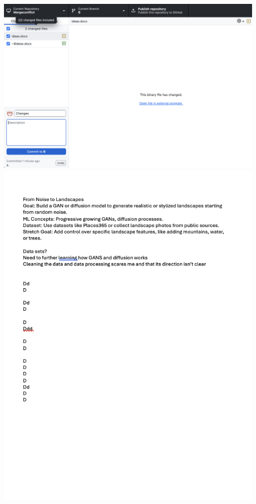 \documentclass[10pt,twocolumn]{article}
\begin{document}
\begin{enumerate}
\includegraphics[width=\linewidth]{13.png}
\includegraphics[width=\linewidth]{14.png}

\end{enumerate}
\end{document}
